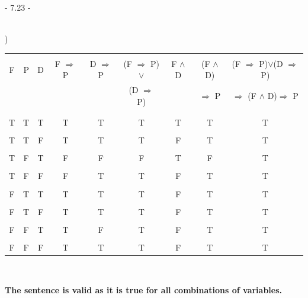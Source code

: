 \documentclass[12pt]{article}
\begin{document}
\centerline{- 7.23 - }
\ \\
) 
\begin{tabular}{|c|c|c||c|c|c||c|c||c|}
	\hline &&&&&&&&\\[-1em]
F & P & D &  F $\Rightarrow$ P  &  D $\Rightarrow$ P  & (F $\Rightarrow$ P)$\vee$  &  F $\wedge$ D  &  (F $\wedge$ D) & (F $\Rightarrow$ P)$\vee$(D $\Rightarrow$ P)\\
 & & & & & (D $\Rightarrow$ P) & &  $\Rightarrow$ P & $\Rightarrow$ (F $\wedge$ D)$\Rightarrow$ P\\
	\hline &&&&&&&&\\[-1em]
	\hline &&&&&&&&\\[-1em]
T&T&T&T&T&T&T&T&T \\
	\hline &&&&&&&&\\[-1em]
T&T&F&T&T&T&F&T&T \\
	\hline &&&&&&&&\\[-1em]
T&F&T&F&F&F&T&F&T \\
	\hline &&&&&&&&\\[-1em]
T&F&F&F&T&T&F&T&T \\
	\hline &&&&&&&&\\[-1em]
F&T&T&T&T&T&F&T&T \\
	\hline &&&&&&&&\\[-1em]
F&T&F&T&T&T&F&T&T \\
	\hline &&&&&&&&\\[-1em]
F&F&T&T&F&T&F&T&T \\
	\hline &&&&&&&&\\[-1em]
F&F&F&T&T&T&F&T&T \\
	\hline
\end{tabular}\\
\begin{center}\textbf{The sentence is valid as it is true for all combinations of variables.}\\[.4em]\end{center}
\end{document}
